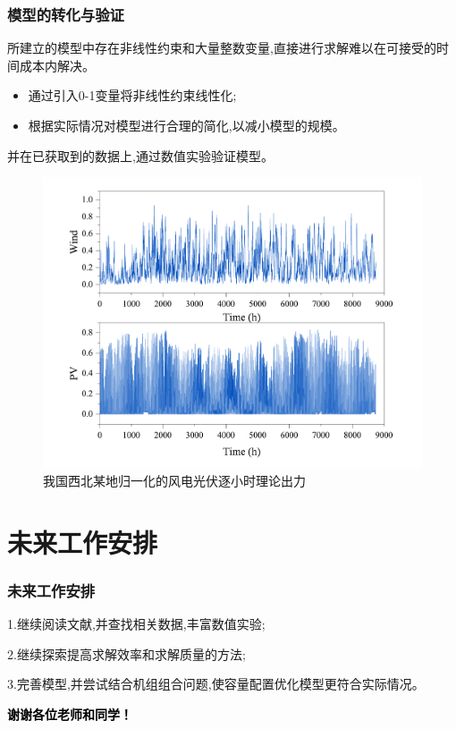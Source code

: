 \documentclass{beamer}
\begin{document}
\begin{frame}
	\frametitle{模型的转化与验证}
	\qquad 所建立的模型中存在非线性约束和大量整数变量,直接进行求解难以在可接受的时间成本内解决。
	\begin{itemize}
		\item 通过引入0-1变量将非线性约束线性化;
		\item 根据实际情况对模型进行合理的简化,以减小模型的规模。
	\end{itemize}
	\qquad 并在已获取到的数据上,通过数值实验验证模型。
	\begin{figure}
		\centering
		\setlength{\abovecaptionskip}{0.cm}
		\includegraphics[scale=0.2]{./pic/windPV.pdf}
		\caption{我国西北某地归一化的风电光伏逐小时理论出力}
		\label{fig.2}
	\end{figure}
\end{frame}

\section{未来工作安排}
\begin{frame}
	\frametitle{未来工作安排} 
	1.继续阅读文献,并查找相关数据,丰富数值实验;

	2.继续探索提高求解效率和求解质量的方法;

	3.完善模型,并尝试结合机组组合问题,使容量配置优化模型更符合实际情况。
\end{frame}

\begin{frame}
	\vspace{1em}
	\centering
	\textcolor{black}{\LARGE\bf 谢谢各位老师和同学！}

\end{frame}
\end{document}

